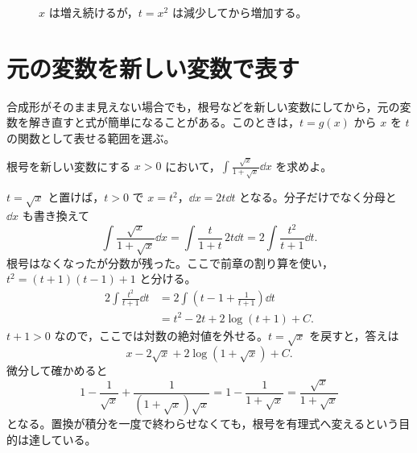 \begin{figure}[htbp]
 \centering
 \caption{$x$ は増え続けるが，$t=x^2$ は減少してから増加する。}
 \label{図:置換の折返し}
\end{figure}

\section{元の変数を新しい変数で表す}\label{節:逆向きの置換}

合成形がそのまま見えない場合でも，根号などを新しい変数にしてから，元の変数を解き直すと式が簡単になることがある。このときは，$t=g(x)$ から $x$ を $t$ の関数として表せる範囲を選ぶ。

\begin{example}{根号を新しい変数にする}
$x>0$ において，$\int\frac{\sqrt{x}}{1+\sqrt{x}}\dd x$ を求めよ。
\end{example}

$t=\sqrt{x}$ と置けば，$t>0$ で $x=t^2$，$\dd x=2t\dd t$ となる。分子だけでなく分母と $\dd x$ も書き換えて
\[
 \int\frac{\sqrt{x}}{1+\sqrt{x}}\dd x
 =\int\frac{t}{1+t}\,2t\dd t
 =2\int\frac{t^2}{t+1}\dd t.
\]
根号はなくなったが分数が残った。ここで前章の割り算を使い，$t^2=(t+1)(t-1)+1$ と分ける。
\[
\begin{aligned}
 2\int\frac{t^2}{t+1}\dd t
 &=2\int\left(t-1+\frac1{t+1}\right)\dd t\\
 &=t^2-2t+2\log(t+1)+C.
\end{aligned}
\]
$t+1>0$ なので，ここでは対数の絶対値を外せる。$t=\sqrt{x}$ を戻すと，答えは
\[
 x-2\sqrt{x}+2\log(1+\sqrt{x})+C.
\]
微分して確かめると
\[
 1-\frac1{\sqrt{x}}+\frac1{(1+\sqrt{x})\sqrt{x}}
 =1-\frac1{1+\sqrt{x}}
 =\frac{\sqrt{x}}{1+\sqrt{x}}
\]
となる。置換が積分を一度で終わらせなくても，根号を有理式へ変えるという目的は達している。

